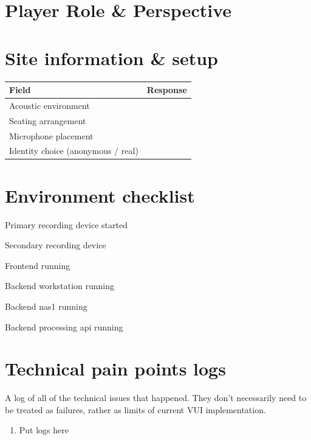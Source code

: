 
\section{Player Role \& Perspective}

\section{Site information \& setup}
\begin{table}[h]
\centering
\begin{tabular}{|p{5cm}|p{10cm}|}
\hline
\textbf{Field} & \textbf{Response} \\ \hline
Acoustic environment & \\[1.5cm] \hline
Seating arrangement & \\[1.5cm] \hline
Microphone placement & \\[1.5cm] \hline
Identity choice (anonymous / real) & \\[1.5cm] \hline
\end{tabular}
\end{table}

\section{Environment checklist}
    \begin{todolist}
    \item Primary recording device started
    \item Secondary recording device
    \item Frontend running
    \item Backend workstation running
    \item Backend nas1 running
    \item Backend processing api running
    \end{todolist}

\section{Technical pain points logs}
A log of all of the technical issues that happened. They don't necessarily need to be treated as failures, rather as limits of current VUI implementation.
\begin{enumerate}
    \item Put logs here
\end{enumerate}